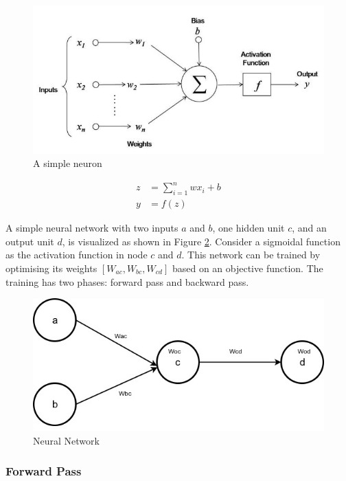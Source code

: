 \documentclass[12pt]{report} %
\begin{document}
\begin{figure}[!tbp]
	\centering
	\caption{A simple neuron}
	\label{neuron}
	\includegraphics[scale=0.50]{image/neuron.jpg}
\end{figure}

\begin{align}
z & = \sum_{i=1}^{n} wx_i + b \\
y & = f(z)
\end{align}


 A simple neural network with two inputs $a$ and $b$, one hidden unit $c$, and an output unit $d$, is visualized as shown in Figure \ref{net}. Consider a sigmoidal function as the activation function in node $c$ and $d$. This network can be trained by optimising its weights $[W_{ac}, W_{bc}, W_{cd}]$ based on an objective function. The training has two phases: forward pass and backward pass.



\begin{figure}[h]
	\centering
	\caption{Neural Network}
	\label{net}
	\includegraphics[scale=0.44]{image/Trace_Back_Prop.jpg}
\end{figure} 



\subsubsection*{Forward Pass}
\end{document}
